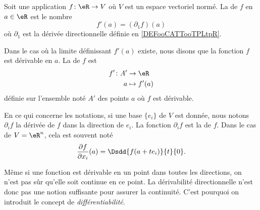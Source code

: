 \begin{definition}[Dérivée]      \label{DEFooOYFZooFWmcAB}
	Soit une application \(f \colon \eR\to V  \) où \( V\) est un espace vectoriel normé. La  de \( f\) en \( a\in \eR\) est le nombre
	\begin{equation}
		f'(a)=(\partial_1f)(a)
	\end{equation}
	où \( \partial_1\) est la dérivée directionnelle définie en \ref{DEFooCATTooTPLtpR}.

	Dans le cas où la limite définissant \( f'(a)\) existe, nous disons que la fonction \( f\) est dérivable en \( a\). La  de \( f\) est
	\begin{equation}
		\begin{aligned}
			f'\colon A' & \to \eR       \\
			a           & \mapsto f'(a)
		\end{aligned}
	\end{equation}
	définie sur l'ensemble noté \( A'\) des points \( a\) où \( f\) est dérivable.
\end{definition}

\begin{normaltext}
	En ce qui concerne les notations, si une base \( \{ e_i \}\) de \( V\) est donnée, nous notons \( \partial_if\) la dérivée de \( f\) dans la direction de \( e_i\). La fonction \( \partial_if\) est la  de \( f\). Dans le cas de \( V=\eR^n\), cela est souvent noté
	\begin{equation}
		\frac{ \partial f }{ \partial x_i }(a)=\Dsdd{ f(a+ te_i) }{t}{0}.
	\end{equation}
\end{normaltext}

\begin{normaltext}
	Même si une fonction est dérivable en un point dans toutes les directions, on n'est pas sûr qu'elle soit continue en ce point. La dérivabilité directionnelle n'est donc pas une notion suffisante pour assurer la continuité. C'est pourquoi on introduit le concept de \emph{différentiabilité}.
\end{normaltext}



